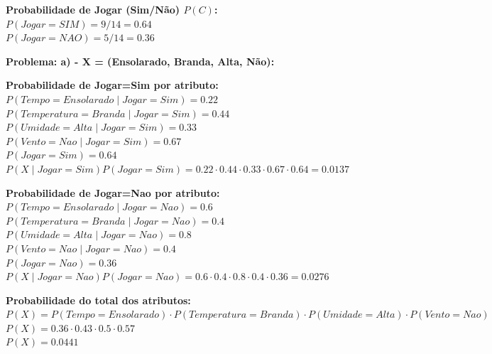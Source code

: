 \documentclass{article}
\begin{document}
  
  \begin{tabbing}
    \textbf{Probabilidade de Jogar (Sim/Não) $P(C)$:} 
    $P(Jogar=SIM) = \text{9/14} = 0.64$ \\
    $P(Jogar=NAO) = \text{5/14} = 0.36$ \\
  \end{tabbing}

  \textbf{\large Problema: a) - X = (Ensolarado, Branda, Alta, Não):}
  
  \begin{tabbing}
    \textbf{Probabilidade de Jogar=Sim por atributo:}\\
    $P(Tempo=Ensolarado \mid Jogar = Sim) =  0.22 $ \\
    $P(Temperatura=Branda \mid Jogar = Sim)  = 0.44 $ \\
    $P(Umidade=Alta \mid Jogar = Sim)  = 0.33 $ \\
    $P(Vento=Nao \mid Jogar = Sim) = 0.67 $ \\
    $P(Jogar=Sim) = 0.64$ \\
    $P(X \mid Jogar=Sim)P(Jogar=Sim) = 0.22 \cdot 0.44 \cdot 0.33 \cdot 0.67 \cdot 0.64 = 0.0137$ \\
  \end{tabbing}
  
  \begin{tabbing}
    \textbf{Probabilidade de Jogar=Nao por atributo:}\\
    $P(Tempo=Ensolarado \mid Jogar = Nao) =  0.6 $ \\
    $P(Temperatura=Branda \mid Jogar = Nao)  = 0.4 $ \\
    $P(Umidade=Alta \mid Jogar = Nao)  = 0.8 $ \\
    $P(Vento=Nao \mid Jogar = Nao) = 0.4 $ \\
    $P(Jogar=Nao) = 0.36$ \\
    $P(X \mid Jogar=Nao)P(Jogar=Nao) = 0.6 \cdot 0.4 \cdot 0.8 \cdot 0.4 \cdot 0.36 = 0.0276$ \\
  \end{tabbing}

  \begin{tabbing}
    \textbf{Probabilidade do total dos atributos:}\\
    $P(X) = P(Tempo=Ensolarado) \cdot P(Temperatura=Branda) \cdot P(Umidade=Alta) \cdot P(Vento=Nao)$ \\
    $P(X) = 0.36 \cdot 0.43 \cdot 0.5 \cdot 0.57$ \\
    $P(X) = 0.0441$  
  \end{tabbing}
  
\end{document}
